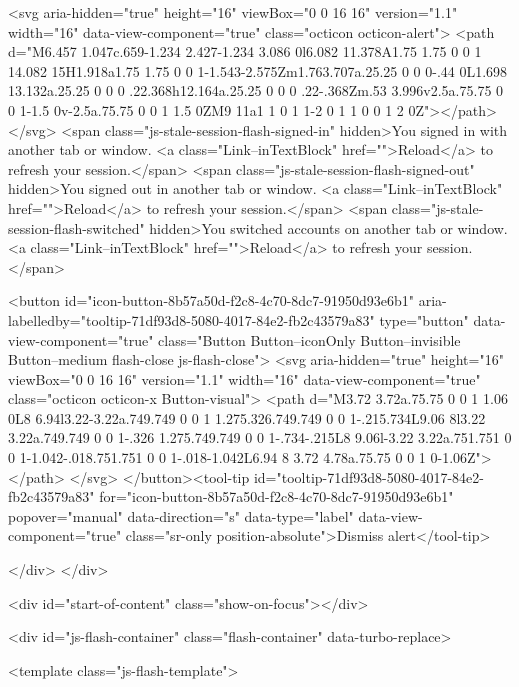         <svg aria-hidden="true" height="16" viewBox="0 0 16 16" version="1.1" width="16" data-view-component="true" class="octicon octicon-alert">
    <path d="M6.457 1.047c.659-1.234 2.427-1.234 3.086 0l6.082 11.378A1.75 1.75 0 0 1 14.082 15H1.918a1.75 1.75 0 0 1-1.543-2.575Zm1.763.707a.25.25 0 0 0-.44 0L1.698 13.132a.25.25 0 0 0 .22.368h12.164a.25.25 0 0 0 .22-.368Zm.53 3.996v2.5a.75.75 0 0 1-1.5 0v-2.5a.75.75 0 0 1 1.5 0ZM9 11a1 1 0 1 1-2 0 1 1 0 0 1 2 0Z"></path>
</svg>
        <span class="js-stale-session-flash-signed-in" hidden>You signed in with another tab or window. <a class="Link--inTextBlock" href="">Reload</a> to refresh your session.</span>
        <span class="js-stale-session-flash-signed-out" hidden>You signed out in another tab or window. <a class="Link--inTextBlock" href="">Reload</a> to refresh your session.</span>
        <span class="js-stale-session-flash-switched" hidden>You switched accounts on another tab or window. <a class="Link--inTextBlock" href="">Reload</a> to refresh your session.</span>

    <button id="icon-button-8b57a50d-f2c8-4c70-8dc7-91950d93e6b1" aria-labelledby="tooltip-71df93d8-5080-4017-84e2-fb2c43579a83" type="button" data-view-component="true" class="Button Button--iconOnly Button--invisible Button--medium flash-close js-flash-close">  <svg aria-hidden="true" height="16" viewBox="0 0 16 16" version="1.1" width="16" data-view-component="true" class="octicon octicon-x Button-visual">
    <path d="M3.72 3.72a.75.75 0 0 1 1.06 0L8 6.94l3.22-3.22a.749.749 0 0 1 1.275.326.749.749 0 0 1-.215.734L9.06 8l3.22 3.22a.749.749 0 0 1-.326 1.275.749.749 0 0 1-.734-.215L8 9.06l-3.22 3.22a.751.751 0 0 1-1.042-.018.751.751 0 0 1-.018-1.042L6.94 8 3.72 4.78a.75.75 0 0 1 0-1.06Z"></path>
</svg>
</button><tool-tip id="tooltip-71df93d8-5080-4017-84e2-fb2c43579a83" for="icon-button-8b57a50d-f2c8-4c70-8dc7-91950d93e6b1" popover="manual" data-direction="s" data-type="label" data-view-component="true" class="sr-only position-absolute">Dismiss alert</tool-tip>


  
</div>
    </div>

  <div id="start-of-content" class="show-on-focus"></div>








    <div id="js-flash-container" class="flash-container" data-turbo-replace>




  <template class="js-flash-template">
    
